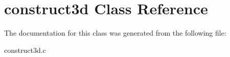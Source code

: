 \hypertarget{classconstruct3d}{}\section{construct3d Class Reference}
\label{classconstruct3d}


The documentation for this class was generated from the following file\+:\begin{DoxyCompactItemize}
\item 
construct3d.\+c\end{DoxyCompactItemize}
